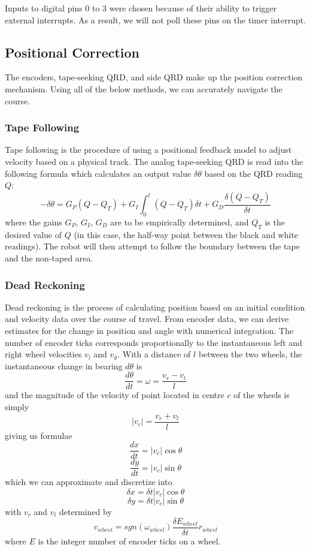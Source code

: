 \documentclass[11pt, oneside]{article} %
\begin{document}
	Inputs to digital pins 0 to 3 were chosen because of their ability to trigger external interrupts. As a result, we will not poll these pins on the timer interrupt.
	
	\subsection{Positional Correction}
	
	The encoders, tape-seeking QRD, and side QRD make up the position correction mechanism. Using all of the below methods, we can accurately navigate the course.
	
		\subsubsection{Tape Following}
		
		Tape following is the procedure of using a positional feedback model to adjust velocity based on a physical track. The analog tape-seeking QRD is read into the following formula which calculates an output value $\delta\theta$ based on the QRD reading $Q$:
		$$-\delta\theta = G_P (Q - Q_T) + G_I \int_{0}^{t} (Q - Q_T) \delta t + G_D \frac{\delta (Q - Q_T)}{\delta t}$$
		where the gains $G_P$, $G_I$, $G_D$ are to be empirically determined, and $Q_T$ is the desired value of $Q$ (in this case, the half-way point between the black and white readings). The robot will then attempt to follow the boundary between the tape and the non-taped area.
		
		\subsubsection{Dead Reckoning}
		
		Dead reckoning is the process of calculating position based on an initial condition and velocity data over the course of travel. From encoder data, we can derive estimates for the change in position and angle with numerical integration. The number of encoder ticks corresponds proportionally to the instantaneous left and right wheel velocities $v_l$ and $v_d$. With a distance of $l$ between the two wheels, the instantaneous change in bearing $d\theta$ is
		$$\frac{d\theta}{dt} = \omega = \frac{v_r - v_l}{l}$$
		and the magnitude of the velocity of point located in centre $c$ of the wheels is simply
		$$\left|v_c\right| = \frac{v_r + v_l}{l}$$
		giving us formulae
		$$\frac{dx}{dt} = \left|v_c\right| \cos{\theta}$$
		$$\frac{dy}{dt} = \left|v_c\right| \sin{\theta}$$
		which we can approximate and discretize into
		$$\delta x = \delta t \left|v_c\right| \cos{\theta}$$
		$$\delta y = \delta t \left|v_c\right| \sin{\theta}$$
		with $v_r$ and $v_l$ determined by
		$$v_{wheel} = sgn(\omega_{wheel}) \frac{\delta E_{wheel}}{\delta t} r_{wheel} $$
		where $E$ is the integer number of encoder ticks on a wheel.
\end{document}
